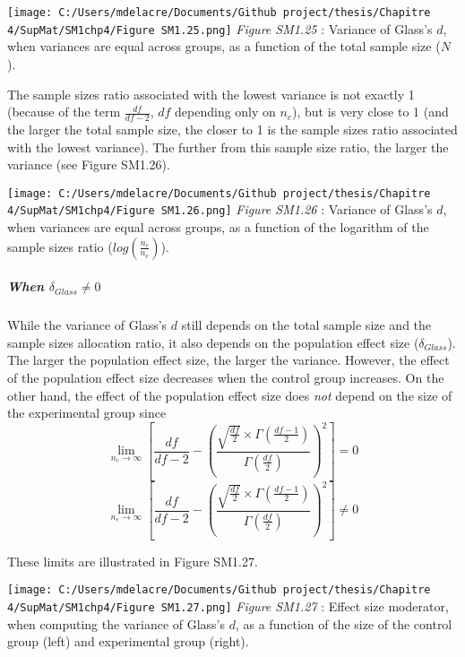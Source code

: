 \documentclass[
  english,
  man,mask,floatsintext]{apa6}
\let\oldsubparagraph\subparagraph
\renewcommand{\subparagraph}[1]{\oldsubparagraph{#1}\mbox{}}
\begin{document}
\texttt{[image: C:/Users/mdelacre/Documents/Github project/thesis/Chapitre 4/SupMat/SM1chp4/Figure SM1.25.png]}
\emph{Figure SM1.25} : Variance of Glass's \(d\), when variances are equal across groups, as a function of the total sample size (\(N\)).

The sample sizes ratio associated with the lowest variance is not exactly 1 (because of the term \(\frac{df}{df-2}\), \(df\) depending only on \(n_c\)), but is very close to 1 (and the larger the total sample size, the closer to 1 is the sample sizes ratio associated with the lowest variance). The further from this sample size ratio, the larger the variance (see Figure SM1.26).

\texttt{[image: C:/Users/mdelacre/Documents/Github project/thesis/Chapitre 4/SupMat/SM1chp4/Figure SM1.26.png]}
\emph{Figure SM1.26} : Variance of Glass's \(d\), when variances are equal across groups, as a function of the logarithm of the sample sizes ratio (\(log\left(\frac{n_c}{n_e} \right)\)).

\hypertarget{when-delta_glass-neq-0}{%
\subparagraph{\texorpdfstring{When \(\delta_{Glass} \neq 0\)}{When \textbackslash delta\_\{Glass\} \textbackslash neq 0}}\label{when-delta_glass-neq-0}}

While the variance of Glass's \(d\) still depends on the total sample size and the sample sizes allocation ratio, it also depends on the population effect size (\(\delta_{Glass}\)). The larger the population effect size, the larger the variance. However, the effect of the population effect size decreases when the control group increases. On the other hand, the effect of the population effect size does \emph{not} depend on the size of the experimental group since\\
\[\lim_{n_c\rightarrow \infty}\left[\frac{df}{df-2} - \left( \frac{\sqrt{\frac{df}{2}} \times \Gamma \left(\frac{df-1}{2} \right)}{\Gamma \left( \frac{df}{2}\right)}\right)^2 \right]=0\]
\[\lim_{n_e\rightarrow \infty}\left[\frac{df}{df-2} - \left( \frac{\sqrt{\frac{df}{2}} \times \Gamma \left(\frac{df-1}{2} \right)}{\Gamma \left( \frac{df}{2}\right)}\right)^2 \right] \neq 0\]

These limits are illustrated in Figure SM1.27.

\texttt{[image: C:/Users/mdelacre/Documents/Github project/thesis/Chapitre 4/SupMat/SM1chp4/Figure SM1.27.png]}
\emph{Figure SM1.27} : Effect size moderator, when computing the variance of Glass's \(d\), as a function of the size of the control group (left) and experimental group (right).
\end{document}
